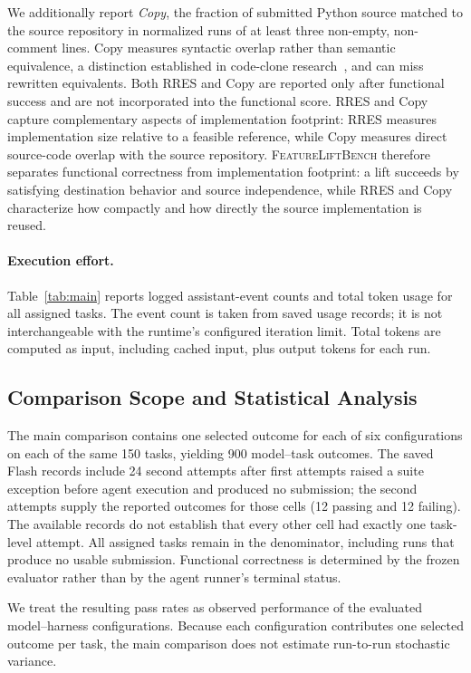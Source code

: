 \documentclass[acmsmall,screen,review,anonymous]{acmart}
\newcommand{\flb}{\textsc{FeatureLiftBench}\xspace}
\begin{document}
We additionally report \emph{Copy}, the fraction of submitted Python source
matched to the source repository in normalized runs of at least three non-empty,
non-comment lines. Copy measures syntactic overlap rather than semantic
equivalence, a distinction established in code-clone
research~\cite{roy2009clones}, and can miss rewritten equivalents.
Both RRES and Copy are reported only after functional success and
are not incorporated into the functional score.
RRES and Copy capture complementary aspects of implementation footprint:
RRES measures implementation size relative to a feasible reference, while
Copy measures direct source-code overlap with the source repository.
\flb therefore separates functional correctness from implementation footprint:
a lift succeeds by satisfying destination behavior and source independence,
while RRES and Copy characterize how compactly and how directly the source
implementation is reused.

\paragraph{Execution effort.}
Table~\ref{tab:main} reports logged assistant-event counts and total token
usage for all assigned tasks. The event count is taken from saved usage records;
it is not interchangeable with the runtime's configured iteration limit. Total
tokens are computed as input, including cached input, plus output tokens for
each run.

\subsection{Comparison Scope and Statistical Analysis}

The main comparison contains one selected outcome for each of six configurations
on each of the same 150 tasks, yielding 900 model--task outcomes. The saved Flash
records include 24 second attempts after first attempts raised a suite exception
before agent execution and produced no submission; the second attempts supply
the reported outcomes for those cells (12 passing and 12 failing). The available
records do not establish
that every other cell had exactly one task-level attempt. All assigned
tasks remain in the denominator, including runs that produce no usable
submission. Functional correctness is determined by the frozen evaluator rather
than by the agent runner's terminal status.

We treat the resulting pass rates as observed performance of the evaluated
model--harness configurations. Because each configuration contributes one
selected outcome per task, the main comparison does not estimate run-to-run
stochastic variance.
\end{document}
